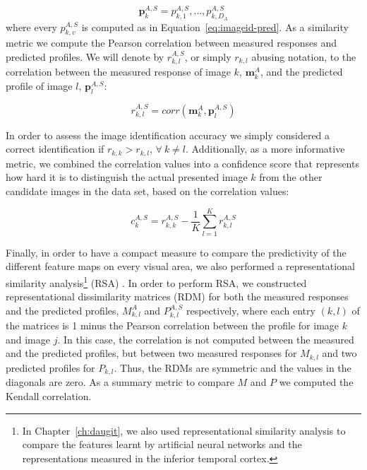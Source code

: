 {\[
    \mathbf{p}_{k}^{A, S} = p_{k, 1}^{A, S}, \ldots, p_{k, D_A}^{A, S}
\]
%
where every $p_{k, v}^{A, S}$ is computed as in Equation~\ref{eq:imageid-pred}. As a similarity metric we compute the Pearson correlation between measured responses and predicted profiles. We will denote by $r_{k, l}^{A, S}$, or simply $r_{k, l}$ abusing notation, to the correlation between the measured response of image $k$, $\mathbf{m}_{k}^{A}$, and the predicted profile of image $l$, $\mathbf{p}_{l}^{A, S}$: 

\begin{equation}
\label{eq:imageid-correlation}
	r_{k, l}^{A, S} = corr(\mathbf{m}_{k}^{A}, \mathbf{p}_{l}^{A, S})
\end{equation}

In order to assess the image identification accuracy we simply considered a correct identification if $r_{k, k} > r_{k, l}$, $\forall~k \neq l$. Additionally, as a more informative metric, we combined the correlation values into a confidence score that represents how hard it is to distinguish the actual presented image $k$ from the other candidate images in the data set, based on the correlation values:

\begin{equation}
\label{eq:imageid-confidence}
c_k^{A, S} = r_{k, k}^{A, S} - \frac{1}{K}\sum_{l=1}^{K}r_{k, l}^{A, S}
\end{equation}

Finally, in order to have a compact measure to compare the predictivity of the different feature maps on every visual area, we also performed a representational similarity analysis\footnote{In Chapter~\ref{ch:daugit}, we also used representational similarity analysis to compare the features learnt by artificial neural networks and the representations measured in the inferior temporal cortex.} (RSA) \citep{kriegeskorte2008rsa}. In order to perform RSA, we constructed representational dissimilarity matrices (RDM) for both the measured responses and the predicted profiles, $M_{k, l}^{A}$ and $P_{k, l}^{A, S}$ respectively, where each entry $(k, l)$ of the matrices is 1 minus the Pearson correlation between the profile for image $k$ and image $j$. In this case, the correlation is not computed between the measured and the predicted profiles, but between two measured responses for $M_{k, l}$ and two predicted profiles for $P_{k, l}$. Thus, the RDMs are symmetric and the values in the diagonals are zero. As a summary metric to compare $M$ and $P$ we computed the Kendall correlation.

}
